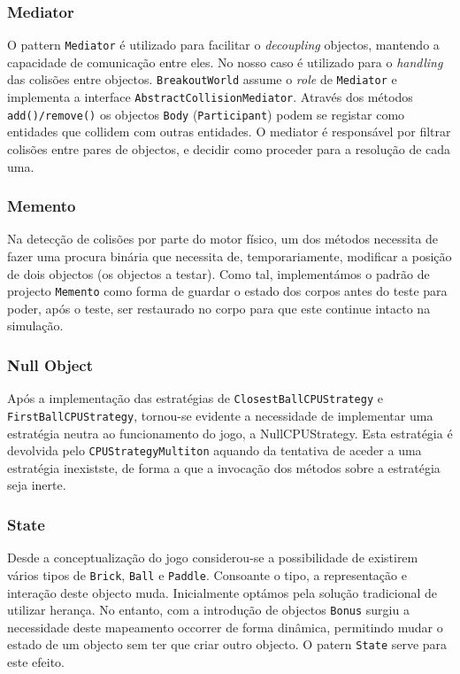 \documentclass[a4paper]{article}
\begin{document}
\subsubsection{Mediator}
\noindent O pattern \texttt{Mediator} é utilizado para facilitar o \emph{decoupling} objectos, mantendo a capacidade de comunicação entre eles. No nosso caso é utilizado para o \emph{handling} das colisões entre objectos. \texttt{BreakoutWorld} assume o \emph{role} de \texttt{Mediator} e implementa a interface \texttt{AbstractCollisionMediator}. Através dos métodos \texttt{add()/remove()} os objectos \texttt{Body} (\texttt{Participant}) podem se registar como entidades que collidem com outras entidades. O mediator é responsável por filtrar colisões entre pares de objectos, e decidir como proceder para a resolução de cada uma.

\subsubsection{Memento}
\noindent Na detecção de colisões por parte do motor físico, um dos métodos necessita de fazer uma procura binária que necessita de, temporariamente, modificar a posição de dois objectos (os objectos a testar). Como tal, implementámos o padrão de projecto \texttt{Memento} como forma de guardar o estado dos corpos antes do teste para poder, após o teste, ser restaurado no corpo para que este continue intacto na simulação.

\subsubsection{Null Object}
\noindent Após a implementação das estratégias de \texttt{ClosestBallCPUStrategy} e \texttt{FirstBallCPUStrategy}, tornou-se evidente a necessidade de implementar uma estratégia neutra ao funcionamento do jogo, a NullCPUStrategy. Esta estratégia é devolvida pelo \texttt{CPUStrategyMultiton} aquando da tentativa de aceder a uma estratégia inexistste, de forma a que a invocação dos métodos sobre a estratégia seja inerte.

\subsubsection{State}
\noindent Desde a conceptualização do jogo considerou-se a possibilidade de existirem vários tipos de \texttt{Brick}, \texttt{Ball} e \texttt{Paddle}. Consoante o tipo, a representação e interação deste objecto muda. Inicialmente optámos pela solução tradicional de utilizar herança. No entanto, com a introdução de objectos \texttt{Bonus} surgiu a necessidade deste mapeamento occorrer de forma dinâmica, permitindo mudar o estado de um objecto sem ter que criar outro objecto. O patern \texttt{State} serve para este efeito.
\end{document}
